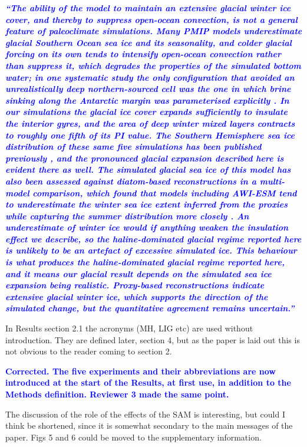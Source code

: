 \documentclass[pdflatex,sn-nature]{sn-jnl}
\begin{document}
\medskip
\noindent\textcolor{blue}{\textbf{\textit{``The ability of the model to maintain an extensive glacial winter ice cover, and thereby to suppress open-ocean convection, is not a general feature of paleoclimate simulations. Many PMIP models underestimate glacial Southern Ocean sea ice and its seasonality, and colder glacial forcing on its own tends to intensify open-ocean convection rather than suppress it, which degrades the properties of the simulated bottom water; in one systematic study the only configuration that avoided an unrealistically deep northern-sourced cell was the one in which brine sinking along the Antarctic margin was parameterised explicitly . In our simulations the glacial ice cover expands sufficiently to insulate the interior gyres, and the area of deep winter mixed layers contracts to roughly one fifth of its PI value. The Southern Hemisphere sea ice distribution of these same five simulations has been published previously , and the pronounced glacial expansion described here is evident there as well. The simulated glacial sea ice of this model has also been assessed against diatom-based reconstructions in a multi-model comparison, which found that models including AWI-ESM tend to underestimate the winter sea ice extent inferred from the proxies while capturing the summer distribution more closely . An underestimate of winter ice would if anything weaken the insulation effect we describe, so the haline-dominated glacial regime reported here is unlikely to be an artefact of excessive simulated ice. This behaviour is what produces the haline-dominated glacial regime reported here, and it means our glacial result depends on the simulated sea ice expansion being realistic. Proxy-based reconstructions indicate extensive glacial winter ice, which supports the direction of the simulated change, but the quantitative agreement remains uncertain.''}}}
\medskip

\medskip
\noindent In Results section 2.1 the acronyms (MH, LIG etc) are used without introduction. They are defined later, section 4, but as the paper is laid out this is not obvious to the reader coming to section 2.
\medskip

\noindent\textcolor{blue}{\textbf{Corrected. The five experiments and their abbreviations are now introduced at the start of the Results, at first use, in addition to the Methods definition. Reviewer 3 made the same point.}}


\medskip
\noindent The discussion of the role of the effects of the SAM is interesting, but could I think be shortened, since it is somewhat secondary to the main messages of the paper. Figs 5 and 6 could be moved to the supplementary information.
\medskip
\end{document}
